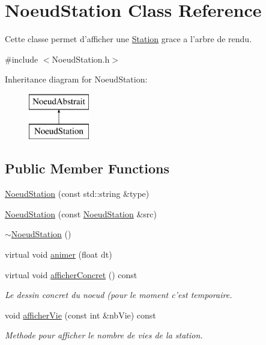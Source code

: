\hypertarget{class_noeud_station}{\section{Noeud\-Station Class Reference}
\label{class_noeud_station}
}


Cette classe permet d'afficher une \hyperlink{class_station}{Station} grace a l'arbre de rendu.  




{\ttfamily \#include $<$Noeud\-Station.\-h$>$}

Inheritance diagram for Noeud\-Station\-:\begin{figure}[H]
\begin{center}
\leavevmode
\includegraphics[height=2.000000cm]{class_noeud_station}
\end{center}
\end{figure}
\subsection*{Public Member Functions}
\begin{DoxyCompactItemize}
\item 
\hyperlink{class_noeud_station_aa5d82a821e4662d843f5d6a4575fa55c}{Noeud\-Station} (const std\-::string \&type)
\item 
\hyperlink{class_noeud_station_a2b47ef290b117b0ec9b585b61bfc9bbe}{Noeud\-Station} (const \hyperlink{class_noeud_station}{Noeud\-Station} \&src)
\item 
\hyperlink{class_noeud_station_a8d3b3efc21e863912a2e336835e4abec}{$\sim$\-Noeud\-Station} ()
\item 
virtual void \hyperlink{class_noeud_station_a91d4bb1205eccd2f1757fb2812542ad0}{animer} (float dt)
\item 
\hypertarget{class_noeud_station_aa196ba98d1d45483745e2ffe2659f92d}{virtual void \hyperlink{class_noeud_station_aa196ba98d1d45483745e2ffe2659f92d}{afficher\-Concret} () const }\label{class_noeud_station_aa196ba98d1d45483745e2ffe2659f92d}

\begin{DoxyCompactList}\small\item\em Le dessin concret du noeud (pour le moment c'est temporaire. \end{DoxyCompactList}\item 
\hypertarget{class_noeud_station_a0fb5f01c5e8e6081a72e754f1b86f977}{void \hyperlink{class_noeud_station_a0fb5f01c5e8e6081a72e754f1b86f977}{afficher\-Vie} (const int \&nb\-Vie) const }\label{class_noeud_station_a0fb5f01c5e8e6081a72e754f1b86f977}

\begin{DoxyCompactList}\small\item\em Methode pour afficher le nombre de vies de la station. \end{DoxyCompactList}\end{DoxyCompactItemize}
